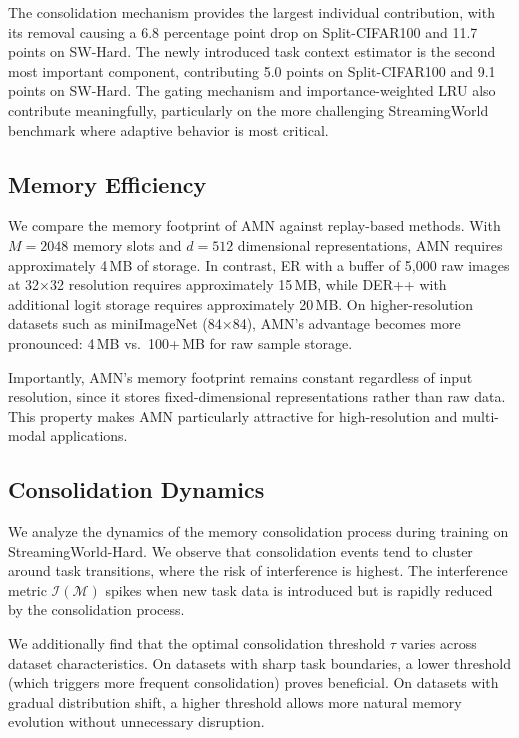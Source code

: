 \documentclass[11pt]{article}
\begin{document}
The consolidation mechanism provides the largest individual contribution, with its removal causing a 6.8 percentage point drop on Split-CIFAR100 and 11.7 points on SW-Hard. The newly introduced task context estimator is the second most important component, contributing 5.0 points on Split-CIFAR100 and 9.1 points on SW-Hard. The gating mechanism and importance-weighted LRU also contribute meaningfully, particularly on the more challenging StreamingWorld benchmark where adaptive behavior is most critical.

\subsection{Memory Efficiency}

We compare the memory footprint of AMN against replay-based methods. With $M = 2048$ memory slots and $d = 512$ dimensional representations, AMN requires approximately 4\,MB of storage. In contrast, ER with a buffer of 5,000 raw images at 32$\times$32 resolution requires approximately 15\,MB, while DER++ with additional logit storage requires approximately 20\,MB. On higher-resolution datasets such as miniImageNet (84$\times$84), AMN's advantage becomes more pronounced: 4\,MB vs.\ 100+\,MB for raw sample storage.

Importantly, AMN's memory footprint remains constant regardless of input resolution, since it stores fixed-dimensional representations rather than raw data. This property makes AMN particularly attractive for high-resolution and multi-modal applications.

\subsection{Consolidation Dynamics}

We analyze the dynamics of the memory consolidation process during training on StreamingWorld-Hard. We observe that consolidation events tend to cluster around task transitions, where the risk of interference is highest. The interference metric $\mathcal{I}(\mathcal{M})$ spikes when new task data is introduced but is rapidly reduced by the consolidation process.

We additionally find that the optimal consolidation threshold $\tau$ varies across dataset characteristics. On datasets with sharp task boundaries, a lower threshold (which triggers more frequent consolidation) proves beneficial. On datasets with gradual distribution shift, a higher threshold allows more natural memory evolution without unnecessary disruption.
\end{document}
